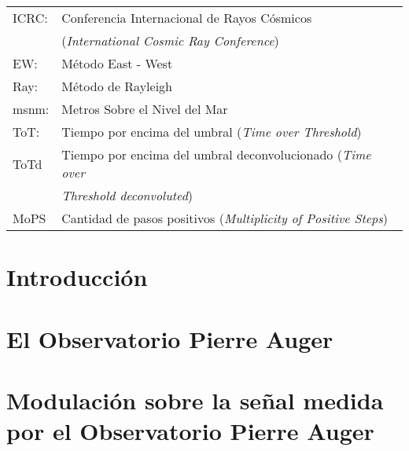 \documentclass[12pt,papel,twoside,pagebackref]{ibtesis}
\begin{document}
\begin{preliminary}
\begin{abreviaturas}
\begin{tabular}{l l}
ICRC: 		& Conferencia Internacional de Rayos Cósmicos \\
			& (\emph{International Cosmic Ray Conference})\\
EW:			& Método East - West\\
Ray:		& Método de Rayleigh\\
msnm:		& Metros Sobre el Nivel del Mar\\
ToT:		& Tiempo por encima del umbral (\emph{Time over Threshold})\\
ToTd		& Tiempo por encima del umbral deconvolucionado (\emph{Time over }\\
			&  \emph{Threshold deconvoluted})\\
MoPS		& Cantidad de pasos positivos (\emph{Multiplicity of Positive Steps})\\
\end{tabular}
\end{abreviaturas}

	\tableofcontents                %
	\listoffigures                  %
	\listoftables                   %

	

\end{preliminary}

\chapter{Introducción}
	\graphicspath{{../01_Introduccion/}}
	
  
\chapter{El Observatorio Pierre Auger}
	\graphicspath{{../02_IntroduccionAuger/}}
	

	\graphicspath{{../03_IntroduccionReport/}}
	

\chapter{Modulación sobre la señal medida por el Observatorio Pierre Auger}

	\graphicspath{{../04_Clima/}}
	
	
	
	
	
\end{document}
